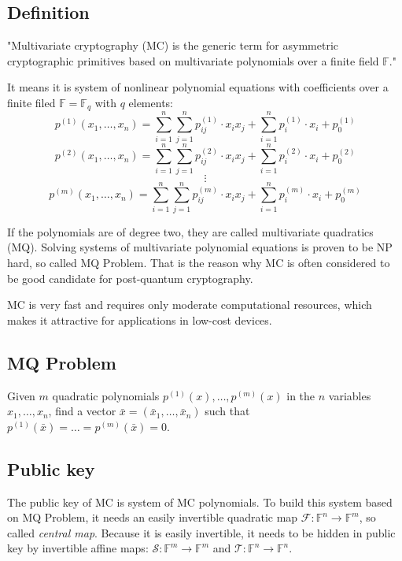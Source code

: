 \documentclass[thesis=M,english]{FITthesis}[2019/12/23]
\begin{document}
\subsection{Definition}
"Multivariate cryptography (MC) is the generic term for asymmetric cryptographic primitives based on multivariate polynomials over a finite field $\mathbb{F}$."\cite{L-WIKI1}

It means it is system of nonlinear polynomial equations with coefficients over a finite filed $\mathbb{F} = \mathbb{F}_q$ with $q$ elements:
\[
	p^{(1)}(x_1,\ldots,x_n) = \sum\limits_{i=1}^{n} {\sum\limits_{j=1}^{n} {p_{ij}^{(1)} \cdot x_ix_j}} + \sum\limits_{i=1}^{n} {p_{i}^{(1)} \cdot x_i} + p_0^{(1)}
\]
\[
	p^{(2)}(x_1,\ldots,x_n) = \sum\limits_{i=1}^{n} {\sum\limits_{j=1}^{n} {p_{ij}^{(2)} \cdot x_ix_j}} + \sum\limits_{i=1}^{n} {p_{i}^{(2)} \cdot x_i} + p_0^{(2)}
\]
\[
	\vdots
\]
\[
	p^{(m)}(x_1,\ldots,x_n) = \sum\limits_{i=1}^{n} {\sum\limits_{j=1}^{n} {p_{ij}^{(m)} \cdot x_ix_j}} + \sum\limits_{i=1}^{n} {p_{i}^{(m)} \cdot x_i} + p_0^{(m)}
\]
 
If the polynomials are of degree two, they are called multivariate quadratics (MQ). Solving systems of multivariate polynomial equations is proven to be NP hard, so called MQ Problem. That is the reason why MC is often considered to be good candidate for post-quantum cryptography.

MC is very fast and requires only moderate computational resources, which makes it attractive for applications in low-cost devices.

\subsection{MQ Problem}
Given $m$ quadratic polynomials $p^{(1)}(x),\ldots,p^{(m)}(x)$ in the $n$ variables $x_1,\ldots,x_n$, find a vector $\bar{x} = (\bar{x}_1,\ldots,\bar{x}_n)$ such that $p^{(1)}(\bar{x}) = \ldots = p^{(m)}(\bar{x}) = 0$.

\subsection{Public key}
The public key of MC is system of MC polynomials. To build this system based on MQ Problem, it needs an easily invertible quadratic map $\mathcal{F}: \mathbb{F}^n \rightarrow \mathbb{F}^m$, so called \textit{central map}. Because it is easily invertible, it needs to be hidden in public key by invertible affine maps: $\mathcal{S}: \mathbb{F}^m \rightarrow \mathbb{F}^m$ and $\mathcal{T}: \mathbb{F}^n \rightarrow \mathbb{F}^n$.
\end{document}
